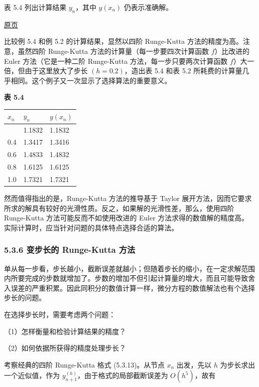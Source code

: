 \documentclass[
  10pt,
  fontset=fandol]{ctexart}
\newcounter{none} %
\begin{document}
表 5.4 列出计算结果 \(y_n\)，其中 \(y(x_n)\) 仍表示准确解。

\href{../../source-images/pdf-132.jpeg}{原页}

比较例 5.4 和例 5.2 的计算结果，显然以四阶 Runge-Kutta 方法的精度为高。注意，虽然四阶 Runge-Kutta 方法的计算量（每一步要四次计算函数 \(f\)）比改进的 Euler 方法（它是一种二阶 Runge-Kutta 方法，每一步只要两次计算函数 \(f\)）大一倍，但由于这里放大了步长 \((h=0.2)\)，造出表 5.4 和表 5.2 所耗费的计算量几乎相同。这个例子又一次显示了选择算法的重要意义。

\textbf{表 5.4}

{\def\LTcaptype{none} %
\begin{longtable}[]{@{}lll@{}}
\toprule\noalign{}
\(x_n\) & \(y_n\) & \(y(x_n)\) \\
\midrule\noalign{}
\endhead
\bottomrule\noalign{}
\endlastfoot
0.2 & 1.1832 & 1.1832 \\
0.4 & 1.3417 & 1.3416 \\
0.6 & 1.4833 & 1.4832 \\
0.8 & 1.6125 & 1.6125 \\
1.0 & 1.7321 & 1.7321 \\
\end{longtable}
}

然而值得指出的是，Runge-Kutta 方法的推导基于 Taylor 展开方法，因而它要求所求的解具有较好的光滑性质。反之，如果解的光滑性差，那么，使用四阶 Runge-Kutta 方法可能反而不如使用改进的 Euler 方法求得的数值解的精度高。实际计算时，应当针对问题的具体特点选择合适的算法。

\subsubsection{5.3.6 变步长的 Runge-Kutta 方法}\label{ux53d8ux6b65ux957fux7684-runge-kutta-ux65b9ux6cd5}

单从每一步看，步长越小，截断误差就越小；但随着步长的缩小，在一定求解范围内所要完成的步数就增加了。步数的增加不但引起计算量的增大，而且可能导致舍入误差的严重积累。因此同积分的数值计算一样，微分方程的数值解法也有个选择步长的问题。

在选择步长时，需要考虑两个问题：

（1）怎样衡量和检验计算结果的精度？

（2）如何依据所获得的精度处理步长？

考察经典的四阶 Runge-Kutta 格式 (5.3.13)。从节点 \(x_n\) 出发，先以 \(h\) 为步长求出一个近似值，作为 \(y_{n+1}^{(h)}\)，由于格式的局部截断误差为 \(O(h^5)\)，故有
\end{document}

